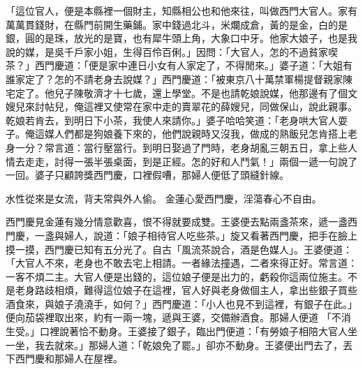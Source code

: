 \begin{showcontents}{}
「這位官人，便是本縣裡一個財主，知縣相公也和他來往，叫做西門大官人。家有萬萬貫錢財，在縣門前開生藥鋪。家中錢過北斗，米爛成倉，黃的是金，白的是銀，圓的是珠，放光的是寶，也有犀牛頭上角，大象口中牙。他家大娘子，也是我說的媒，是吳千戶家小姐，生得百伶百俐。」因問：「大官人，怎的不過貧家喫茶？」西門慶道：「便是家中連日小女有人家定了，不得閒來。」婆子道：「大姐有誰家定了？怎的不請老身去說媒？」西門慶道：「被東京八十萬禁軍楊提督親家陳宅定了。他兒子陳敬濟才十七歲，還上學堂。不是也請乾娘說媒，他那邊有了個文嫂兒來討帖兒，俺這裡又使常在家中走的賣翠花的薛嫂兒，同做保山，說此親事。乾娘若肯去，到明日下小茶，我使人來請你。」婆子哈哈笑道：「老身哄大官人耍子。俺這媒人們都是狗娘養下來的，他們說親時又沒我，做成的熟飯兒怎肯搭上老身一分？常言道：當行壓當行。到明日娶過了門時，老身胡亂三朝五日，拿上些人情去走走，討得一張半張桌面，到是正經。怎的好和人鬥氣！」兩個一遞一句說了一回。婆子只顧誇獎西門慶，口裡假嘈，那婦人便低了頭縫針線。

水性從來是女流，背夫常與外人偷。
金蓮心愛西門慶，淫蕩春心不自由。

西門慶見金蓮有幾分情意歡喜，恨不得就要成雙。王婆便去點兩盞茶來，遞一盞西門慶，一盞與婦人，說道：「娘子相待官人吃些茶。」旋又看著西門慶，把手在臉上摸一摸，西門慶已知有五分光了。自古「風流茶說合，酒是色媒人」。王婆便道：「大官人不來，老身也不敢去宅上相請。一者緣法撞遇，二者來得正好。常言道：一客不煩二主。大官人便是出錢的，這位娘子便是出力的，虧殺你這兩位施主。不是老身路歧相煩，難得這位娘子在這裡，官人好與老身做個主人，拿出些銀子買些酒食來，與娘子澆澆手，如何？」西門慶道：「小人也見不到這裡，有銀子在此。」便向茄袋裡取出來，約有一兩一塊，遞與王婆，交備辦酒食。那婦人便道 「不消生受。」口裡說著恰不動身。王婆接了銀子，臨出門便道：「有勞娘子相陪大官人坐一坐，我去就來。」那婦人道：「乾娘免了罷。」卻亦不動身。王婆便出門去了，丟下西門慶和那婦人在屋裡。


\end{showcontents}
